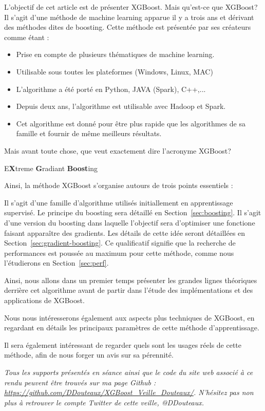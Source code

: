 L'objectif de cet article est de présenter XGBoost. Mais qu'est-ce que XGBoost? Il s'agit d'une méthode de machine learning apparue il y a trois ans et dérivant des méthodes dites de boosting. Cette méthode est présentée par ses créateurs comme étant :
\begin{itemize}
	\item[\thColor{\faFlag~~Flexible}]Prise en compte de plusieurs thématiques de machine learning.
	\item[\thColor{\faCube~~Portable}]Utilisable sous toutes les plateformes (Windows, Linux, MAC)
	\item[\thColor{\faCommentsO~~Multi-langages}]L'algorithme a été porté en Python, JAVA (Spark), C++,...
	\item[\thColor{\faCloud~~Distribuée}]Depuis deux ans, l'algorithme est utilisable avec Hadoop et Spark.
	\item[\thColor{\faRocket~~Perfomante}]Cet algorithme est donné pour être plus rapide que les algorithmes de sa famille et fournir de même meilleurs résultats.
\end{itemize}
Mais avant toute chose, que veut exactement dire l'acronyme \og XGBoost\fg?
\begin{center}
E\textbf{\textcolor{bluenight}{X}}treme \textbf{\textcolor{bluenight}{G}}radiant \textbf{\textcolor{bluenight}{Boost}}ing
\end{center}
Ainsi, la méthode XGBoost s'organise autours de trois points essentiels :
\begin{itemize}
	Il s'agit d'une famille d'algorithme utilisés initiallement en apprentissage supervisé. Le principe du boosting sera détaillé en Section~\ref{sec:boosting}.
	Il s'agit d'une version du boosting dans laquelle l'objectif sera d'optimiser une fonctione faisant apparaître des gradients. Les détails de cette idée seront détaillées en Section~\ref{sec:gradient-boosting}.
	Ce qualificatif signifie que la recherche de performances est poussée au maximum pour cette méthode, comme nous l'étudierons en Section~\ref{sec:perf}.
\end{itemize}
Ainsi, nous allons dans un premier temps présenter les grandes lignes théoriques derrière cet algorithme avant de partir dans l'étude des implémentations et des applications de XGBoost.

Nous nous intéresserons également aux aspects plus techniques de XGBoost, en regardant en détails les principaux paramètres de cette méthode d'apprentissage.

Il sera également intéressant de regarder quels sont les usages réels de cette méthode, afin de nous forger un avis sur sa pérennité.

\vskip 1cm
\textit{Tous les supports présentés en séance ainsi que le code du site web associé à ce rendu peuvent être trouvés sur ma page Github : \url{https://github.com/DDouteaux/XGBoost_Veille_Douteaux/}. N'hésitez pas non plus à retrouver le compte Twitter de cette veille, @DDouteaux.}
